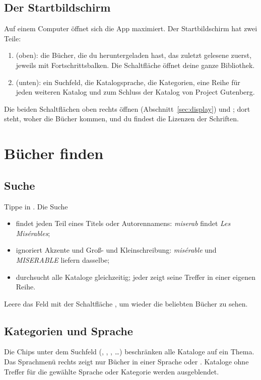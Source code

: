 \documentclass[11pt]{article}
\begin{document}
\subsection{Der Startbildschirm}
Auf einem Computer öffnet sich die App maximiert. Der Startbildschirm hat zwei Teile:

\begin{enumerate}
  \item {} (oben): die Bücher, die du heruntergeladen hast, das zuletzt
        gelesene zuerst, jeweils mit Fortschrittsbalken. Die Schaltfläche
         öffnet deine ganze Bibliothek.
  \item {} (unten): ein Suchfeld, die Katalogsprache, die
        Kategorien, eine Reihe für jeden weiteren Katalog und zum Schluss der Katalog von Project
        Gutenberg.
\end{enumerate}


Die beiden Schaltflächen oben rechts öffnen 
(Abschnitt~\ref{sec:display}) und ; dort steht, woher die Bücher kommen, und du findest
die Lizenzen der Schriften.

\section{Bücher finden}

\subsection{Suche}
Tippe in . Die Suche
\begin{itemize}
  \item findet jeden Teil eines Titels oder Autorennamens: \emph{miserab} findet
        \emph{Les Misérables};
  \item ignoriert Akzente und Groß- und Kleinschreibung: \emph{misérable} und \emph{MISERABLE}
        liefern dasselbe;
  \item durchsucht alle Kataloge gleichzeitig; jeder zeigt seine Treffer in einer eigenen Reihe.
\end{itemize}
Leere das Feld mit der Schaltfläche , um wieder die beliebten Bücher zu sehen.

\subsection{Kategorien und Sprache}
Die Chips unter dem Suchfeld (, , , …)
beschränken alle Kataloge auf ein Thema. Das Sprachmenü rechts zeigt nur Bücher in einer Sprache
oder . Kataloge ohne Treffer für die gewählte Sprache oder Kategorie werden
ausgeblendet.
\end{document}
